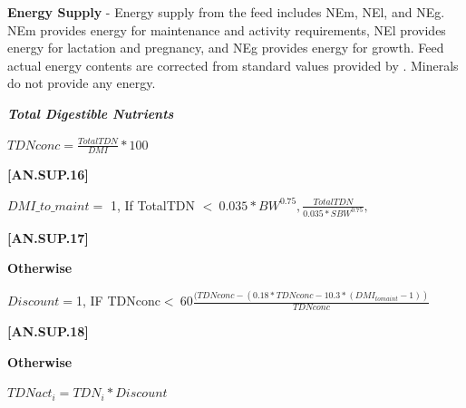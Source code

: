 \begin{refsection}
\textbf{ Energy Supply} - Energy supply from the feed includes NEm, NEl, and NEg. NEm provides energy for maintenance and activity requirements, NEl provides energy for lactation and pregnancy, and NEg provides energy for growth. Feed actual energy contents are corrected from standard values provided by \textcite{nrc2001}. Minerals do not provide any energy.
    \vspace{0.2cm}


    \textbf{\textit{Total Digestible Nutrients}} 
    \vspace{0.25cm}

    \begin{center}
    \(TDNconc = \frac{TotalTDN}{DMI} * 100\)
    \end{center}
    \vspace{0.5cm}
    
            {\raggedleft \textbf{[AN.SUP.16]}\par}
            \vspace{0.5cm}

    \begin{center}
    \(DMI\_to\_maint =\) 1, If TotalTDN \(<\ 0.035 * BW^{0.75}, \frac{TotalTDN}{0.035*SBW^{0.75}}, \)
    \end{center}
    \vspace{0.5cm}
    
            {\raggedleft \textbf{[AN.SUP.17]}\par}
            \vspace{0.5cm}
            
\textbf{Otherwise}
\vspace{0.25cm}

    \begin{center}
    \(Discount = \)1, IF TDNconc\( <\ 60 \frac{(TDNconc-(0.18*TDNconc-10.3*(DMI_{tomaint}-1))}{TDNconc} \)
    \end{center}
    \vspace{0.5cm}
    
            {\raggedleft \textbf{[AN.SUP.18]}\par}
            \vspace{0.5cm}

\textbf{Otherwise}
\vspace{0.25cm}

    \begin{center}
    \(TDNact_{i} = TDN_{i} * Discount \)
    \end{center}
    \vspace{0.5cm}
    

\end{refsection}
